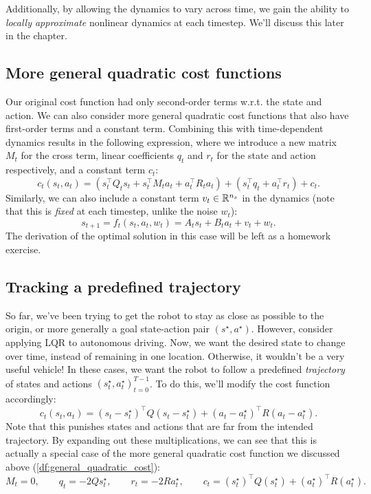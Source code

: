 \documentclass[../main/main]{subfiles}
\begin{document}
Additionally, by allowing the dynamics to vary across time,
we gain the ability to \emph{locally approximate} nonlinear dynamics at each timestep.
We'll discuss this later in the chapter.

\subsection[General quadratic cost]{More general quadratic cost functions}

Our original cost function had only second-order terms w.r.t. the state and action. We can also consider more general quadratic cost functions that also have first-order terms and a constant term. Combining this with
time-dependent dynamics results in the following expression, where we introduce a new matrix $M_t$ for the cross term, linear coefficients $q_t$ and $r_t$ for the state and action respectively, and a constant term $c_t$:
\begin{equation}
    c_t(s_t, a_t) = ( s_t^\top Q_t s_t + s_t^\top M_t a_t + a_t^\top R_t a_t ) + (s_t^\top q_t + a_t^\top r_t) + c_t.
    \label{df:general_quadratic_cost}
\end{equation}
Similarly, we can also include a constant term $v_t \in \mathbb{R}^{n_s}$ in the dynamics (note that this is \emph{fixed} at each timestep, unlike the noise $w_t$):
\[
    s_{t+1} = f_t(s_t, a_t, w_t) = A_t s_t + B_t a_t + v_t + w_t.
\]
The derivation of the optimal solution in this case will be left as a homework exercise.


\subsection{Tracking a predefined trajectory}

So far, we've been trying to get the robot to stay as close as possible to the origin, or more generally a goal state-action pair $(s^\star, a^\star).$ However, consider applying LQR to autonomous driving. Now, we want the desired state to change over time, instead of remaining in one location. Otherwise, it wouldn't be a very useful vehicle!
In these cases, we want the robot to follow a predefined \emph{trajectory} of
states and actions $(s_t^\star, a_t^\star)_{t=0}^{T-1}$. To do this, we'll modify the cost function accordingly:
\[
    c_t(s_t, a_t) = (s_t - s^\star_t)^\top Q (s_t - s^\star_t) + (a_t - a^\star_t)^\top R (a_t - a^\star_t).
\]
Note that this punishes states and actions that are far from the intended trajectory. By expanding out these multiplications, we can see that this is actually a special case of the more general quadratic cost function we discussed above (\autoref{df:general_quadratic_cost}): \[
    M_t = 0, \qquad q_t = -2Q s^\star_t, \qquad r_t = -2R a^\star_t, \qquad c_t = (s^\star_t)^\top Q (s^\star_t) + (a^\star_t)^\top R (a^\star_t).
\]
\end{document}
